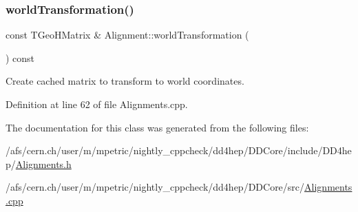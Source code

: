 \subsubsection{\texorpdfstring{world\+Transformation()}{worldTransformation()}}
{\footnotesize\ttfamily const T\+Geo\+H\+Matrix \& Alignment\+::world\+Transformation (\begin{DoxyParamCaption}{ }\end{DoxyParamCaption}) const}



Create cached matrix to transform to world coordinates. 



Definition at line 62 of file Alignments.\+cpp.



The documentation for this class was generated from the following files\+:\begin{DoxyCompactItemize}
\item 
/afs/cern.\+ch/user/m/mpetric/nightly\+\_\+cppcheck/dd4hep/\+D\+D\+Core/include/\+D\+D4hep/\hyperlink{_alignments_8h}{Alignments.\+h}\item 
/afs/cern.\+ch/user/m/mpetric/nightly\+\_\+cppcheck/dd4hep/\+D\+D\+Core/src/\hyperlink{_alignments_8cpp}{Alignments.\+cpp}\end{DoxyCompactItemize}
